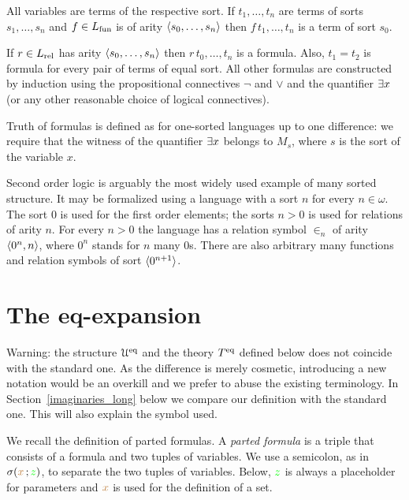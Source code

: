 \documentclass[creche.tex]{subfiles}
\begin{document}
All variables are terms of the respective sort. If $t_1,\dots,t_n$ are terms of sorts $s_1,\dots,s_n$ and $f\in L_{\rm fun}$ is of arity $\langle s_0,\dots,s_n\rangle$ then $f\,t_1,\dots,t_n$ is a term of sort $s_0$. 

If $r\in L_{\rm rel}$ has arity $\langle s_0,\dots,s_n\rangle$ then $r\,t_0,\dots,t_n$ is a formula. Also, $t_1=t_2$ is formula for every pair of terms of equal sort. All other formulas are constructed by induction using the propositional connectives $\neg$ and $\vee$ and the quantifier $\exists x$ (or any other reasonable choice of logical connectives).

Truth of formulas is defined as for one-sorted languages up to one difference: we require that the witness of the quantifier $\exists x$ belongs to $M_s$, where $s$ is the sort of the variable $x$.

Second order logic is arguably the most widely used example of many sorted structure. It may be formalized using a language with a sort $n$ for every $n\in\omega$. The sort $0$ is used for the first order elements; the sorts $n>0$ is used for relations of arity $n$. For every $n>0$ the language has a relation symbol $\in_n$ of arity $\langle0^n,n\rangle$, where $0^n$ stands for $n$ many $0$s. There are also arbitrary many functions and relation symbols of sort $\langle0^{n+1}\rangle$.

\section{The eq-expansion}\label{immaginari}

\noindent\llap{\textcolor{red}{\Large\danger}\kern1.5ex}Warning: the structure $\EuScript U^{{\rm eq}}$ and the theory $T^{{\rm eq}}$ defined below does not coincide with the standard one. As the difference is merely cosmetic, introducing a new notation would be an overkill and we prefer to abuse the existing terminology. In Section~\ref{imaginaries_long} below we compare our definition with the standard one. This will also explain the symbol used.

We recall the definition of parted formulas. A \emph{parted formula\/} is a triple that consists of a formula and two tuples of variables. We use a semicolon, as in $\sigma({\color{brown} x}\,;{\color{green} z})$, to separate the two tuples of variables. Below, ${\color{green} z}$ is always a placeholder for parameters and ${\color{brown} x}$ is used for the definition of a set.
\end{document}
